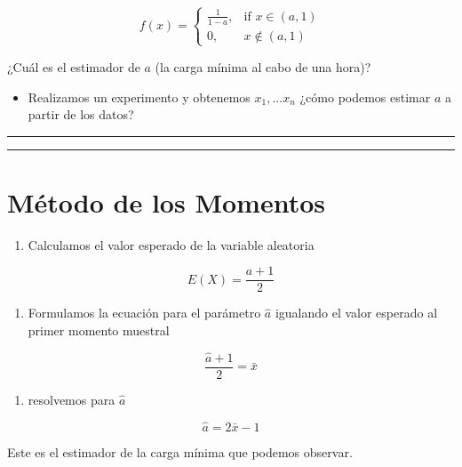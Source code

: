 \documentclass[
]{book}
\providecommand{\tightlist}{%
  \setlength{\itemsep}{0pt}\setlength{\parskip}{0pt}}
\begin{document}
\[
f(x)=
\begin{cases}
    \frac{1}{1-a},& \text{if } x\in (a,1)\\
    0,& x\notin (a,1)
\end{cases}
\]

¿Cuál es el estimador de \(a\) (la carga mínima al cabo de una hora)?

\begin{itemize}
\tightlist
\item
  Realizamos un experimento y obtenemos \(x_1,...x_n\) ¿cómo podemos estimar \(a\) a partir de los datos?
\end{itemize}

\begin{center}\rule{0.5\linewidth}{0.5pt}\end{center}

\begin{center}\rule{0.5\linewidth}{0.5pt}\end{center}

\hypertarget{muxe9todo-de-los-momentos-4}{%
\section{Método de los Momentos}\label{muxe9todo-de-los-momentos-4}}

\begin{enumerate}
\def\labelenumi{\arabic{enumi}.}
\tightlist
\item
  Calculamos el valor esperado de la variable aleatoria
\end{enumerate}

\[E(X)=\frac{a+1}{2}\]

\begin{enumerate}
\def\labelenumi{\arabic{enumi}.}
\setcounter{enumi}{1}
\tightlist
\item
  Formulamos la ecuación para el parámetro \(\hat{a}\) igualando el valor esperado al primer momento muestral
\end{enumerate}

\[\frac{\hat{a}+1}{2}=\bar{x}\]

\begin{enumerate}
\def\labelenumi{\arabic{enumi}.}
\setcounter{enumi}{2}
\tightlist
\item
  resolvemos para \(\hat{a}\)
\end{enumerate}

\[\hat{a}=2\bar{x}-1\]

Este es el estimador de la carga mínima que podemos observar.
\end{document}
